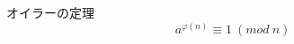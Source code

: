 \documentclass[fleqn,leqno,autodetect-engine,dvipdfmxi-if-dvi,ja=standard]{bxjsarticle}
\begin{document}
オイラーの定理
\begin{displaymath}
a^{φ(n)} \equiv 1\ (mod\ n)
\end{displaymath}
\end{document}
